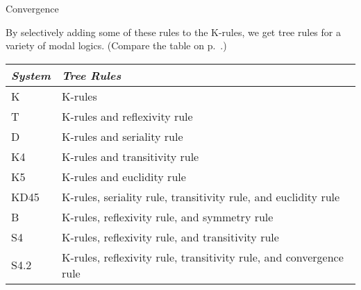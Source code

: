 \begin{center}
\begin{minipage}[t]{0.3\textwidth}
    \medskip

  \end{minipage}
  \begin{minipage}[t]{0.3\textwidth} \centering
    Convergence
    
    \medskip

  \end{minipage}

\end{center}

By selectively adding some of these rules to the K-rules, we get tree rules for
a variety of modal logics.  (Compare the table on p.\
\pageref{table:systems}.)

\bigskip
\begin{tabular}{ll}
  \toprule
  \emph{System} & \emph{Tree Rules}\\
  \midrule
  K & K-rules\\
  T & K-rules and reflexivity rule\\
  D & K-rules and seriality rule\\
  K4 & K-rules and transitivity rule\\
  K5 & K-rules and euclidity rule\\
  KD45 & K-rules, seriality rule, transitivity rule, and euclidity rule\\
  B & K-rules, reflexivity rule, and symmetry rule\\
  S4 & K-rules, reflexivity rule, and transitivity rule\\ 
  S4.2 & K-rules, reflexivity rule, transitivity rule, and convergence rule\\
  \bottomrule
\end{tabular}
\bigskip


